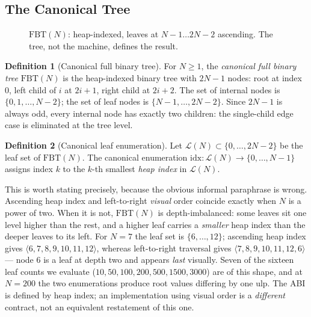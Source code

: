 \documentclass[journal,10pt]{IEEEtran}
\theoremstyle{plain}
\theoremstyle{definition}
\newtheorem{definition}{Definition}
\theoremstyle{remark}
\newcommand{\FBT}{\ensuremath{\mathrm{FBT}}}
\begin{document}
\subsection{The Canonical Tree}\label{sec:abi-tree}

\begin{figure}[!t]\centering

\caption{$\FBT(N)$: heap-indexed, leaves at $N{-}1 \ldots 2N{-}2$ ascending. The tree, not the machine, defines the result.}\label{fig:canontree}
\end{figure}


\begin{definition}[Canonical full binary tree]\label{def:fbt}
For $N \geq 1$, the \emph{canonical full binary tree} $\FBT(N)$ is the
heap-indexed binary tree with $2N-1$ nodes: root at index $0$, left child of
$i$ at $2i+1$, right child at $2i+2$. The set of internal nodes is
$\{0,1,\ldots,N-2\}$; the set of leaf nodes is $\{N-1,\ldots,2N-2\}$. Since
$2N-1$ is always odd, every internal node has exactly two children: the
single-child edge case is eliminated at the tree level.
\end{definition}

\begin{definition}[Canonical leaf enumeration]\label{def:leafenum}
Let $\mathcal{L}(N) \subset \{0,\ldots,2N-2\}$ be the leaf set of $\FBT(N)$.
The canonical enumeration $\mathrm{idx}: \mathcal{L}(N) \to \{0,\ldots,N-1\}$
assigns index $k$ to the $k$-th smallest \emph{heap index} in
$\mathcal{L}(N)$.
\end{definition}

This is worth stating precisely, because the obvious informal paraphrase is
wrong. Ascending heap index and left-to-right \emph{visual} order coincide
exactly when $N$ is a power of two. When it is not, $\FBT(N)$ is
depth-imbalanced: some leaves sit one level higher than the rest, and a
higher leaf carries a \emph{smaller} heap index than the deeper leaves to its
left. For $N=7$ the leaf set is $\{6,\ldots,12\}$; ascending heap index gives
$\langle 6,7,8,9,10,11,12\rangle$, whereas left-to-right traversal gives
$\langle 7,8,9,10,11,12,6\rangle$ --- node $6$ is a leaf at depth two and
appears \emph{last} visually. Seven of the sixteen leaf counts we evaluate
($10, 50, 100, 200, 500, 1500, 3000$) are of this shape, and at $N=200$ the
two enumerations produce root values differing by one ulp. The ABI is defined
by heap index; an implementation using visual order is a \emph{different}
contract, not an equivalent restatement of this one.
\end{document}
